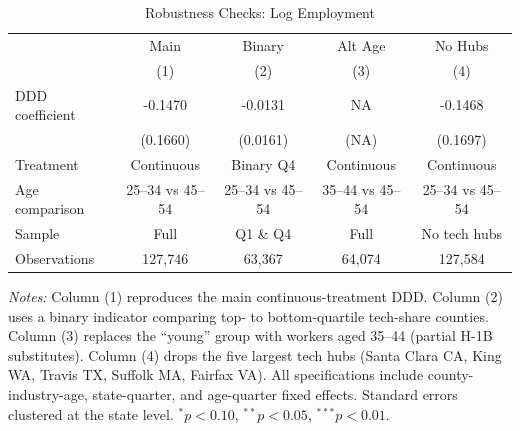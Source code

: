 \begin{table}[htbp]
\centering
\caption{Robustness Checks: Log Employment}
\label{tab:robustness}
\begin{tabular}{lcccc}
\toprule
 & Main & Binary & Alt Age & No Hubs \\
 & (1) & (2) & (3) & (4) \\
\midrule
DDD coefficient & -0.1470 & -0.0131 & NA & -0.1468 \\
 & (0.1660) & (0.0161) & (NA) & (0.1697) \\
[0.5em]
Treatment & Continuous & Binary Q4 & Continuous & Continuous \\
Age comparison & 25--34 vs 45--54 & 25--34 vs 45--54 & 35--44 vs 45--54 & 25--34 vs 45--54 \\
Sample & Full & Q1 \& Q4 & Full & No tech hubs \\
Observations & 127,746 & 63,367 & 64,074 & 127,584 \\
\bottomrule
\end{tabular}
\begin{tablenotes}[flushleft]
\small
\item \textit{Notes:} Column (1) reproduces the main continuous-treatment DDD. Column (2) uses a binary indicator comparing top- to bottom-quartile tech-share counties. Column (3) replaces the ``young'' group with workers aged 35--44 (partial H-1B substitutes). Column (4) drops the five largest tech hubs (Santa Clara CA, King WA, Travis TX, Suffolk MA, Fairfax VA). All specifications include county-industry-age, state-quarter, and age-quarter fixed effects. Standard errors clustered at the state level. $^{*}p<0.10$, $^{**}p<0.05$, $^{***}p<0.01$.
\end{tablenotes}
\end{table}

